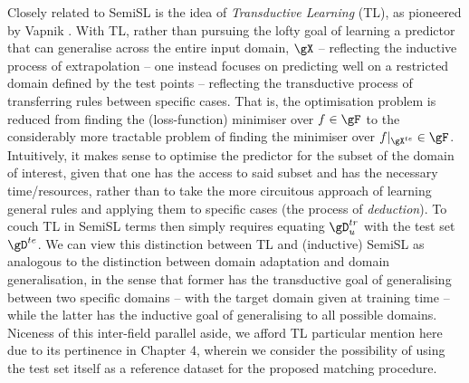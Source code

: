 %
%
Closely related to SemiSL is the idea of \emph{Transductive Learning} (TL), as pioneered by Vapnik
\citep{gammerman1998learning}. 
%
With TL, rather than pursuing the lofty goal of learning a predictor that can generalise across the
entire input domain, \( \gX \) -- reflecting the inductive process of extrapolation -- one instead
focuses on predicting well on a restricted domain defined by the test points -- reflecting the
transductive process of transferring rules between specific cases. 
%
That is, the optimisation problem is reduced from finding the (loss-function) minimiser over \(f
\in \gF \)  to the considerably more tractable problem of finding the minimiser over \(
f|_{\gX^{te}} \in \gF \).
%
Intuitively, it makes sense to optimise the predictor for the subset of the domain of interest,
given that one has the access to said subset and has the necessary time/resources, rather than to
take the more circuitous approach of learning general rules and applying them to specific cases
(the process of \emph{deduction}).
%
To couch TL in SemiSL terms then simply requires equating \(\gD^{tr}_u \) with the test set
\(\gD^{te} \).
%
We can view this distinction between TL and (inductive) SemiSL as analogous to the distinction
between domain adaptation and domain generalisation, in the sense that former has the transductive
goal of generalising between two specific domains -- with the target domain given at training time
-- while the latter has the inductive goal of generalising to all possible domains.
%
Niceness of this inter-field parallel aside, we afford TL particular mention here due to its
pertinence in Chapter 4, wherein we consider the possibility of using the test set itself as a
reference dataset for the proposed matching procedure.


